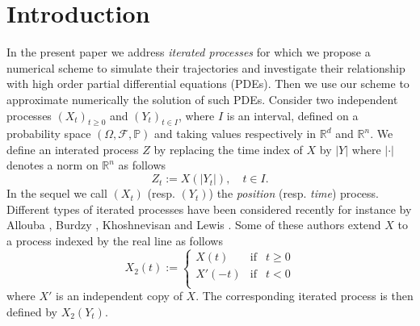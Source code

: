\documentclass[a4paper, 11pt]{article}
\renewcommand{\P}{\mathbb{P}}
\newcommand{\R}{\mathbb{R}}
\newcommand{\1}{\mathbf{1}}
\begin{document}
\section{Introduction}
In the present paper we address {\it iterated processes} for which we propose a numerical scheme to simulate their trajectories and investigate their relationship with high order partial differential equations (PDEs). Then we use our scheme to approximate numerically the solution of such PDEs. Consider two independent processes $(X_t)_{t\geq 0}$ and $(Y_t)_{t\in I}$, where $I$ is an interval, defined on a probability space $(\Omega, \mathcal{F}, \P)$ and taking values respectively in $\R^d$ and $\R^n$. We define an interated process $Z$ by replacing the time index of $X$ by $|Y|$ where $|\cdot|$ denotes a norm on $\R^n$ as follows
\begin{equation}
\label{processusitere}
Z_t:=X(|Y_t|),\quad t\in I.
\end{equation}
In the sequel we call $(X_t)$ (resp. $(Y_t)$) the {\it position} (resp. {\it time}) process. Different types of iterated processes have been considered recently for instance by Allouba \cite{allouba1, allouba}, Burdzy \cite{burdzy1, burdzy3, burdzy2}, Khoshnevisan and Lewis \cite{khoshnevisan}. 
Some of these authors extend $X$ to a process indexed by the real line as follows
\begin{equation}
\label{realline}
X_2(t):=\left \lbrace 
\begin{array}{lcl} 
X(t)&\text{if}& t\geq 0\\ 
X'(-t)&\text{if}& t<0\\ 
\end{array}\right.
\end{equation}
where $X'$ is an independent copy of $X$. The corresponding iterated process is then defined by $X_2(Y_t)$. 

\smallskip
\end{document}
